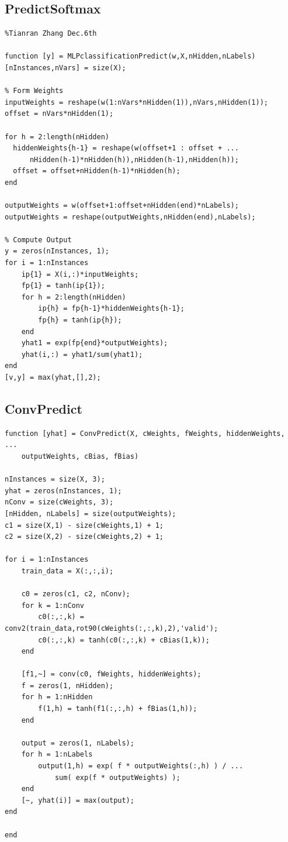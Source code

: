 \documentclass[12pt]{article}
\begin{document}
\subsection{PredictSoftmax}
\begin{lstlisting}
%Tianran Zhang Dec.6th

function [y] = MLPclassificationPredict(w,X,nHidden,nLabels)
[nInstances,nVars] = size(X);

% Form Weights
inputWeights = reshape(w(1:nVars*nHidden(1)),nVars,nHidden(1));
offset = nVars*nHidden(1);

for h = 2:length(nHidden)
  hiddenWeights{h-1} = reshape(w(offset+1 : offset + ...
      nHidden(h-1)*nHidden(h)),nHidden(h-1),nHidden(h));
  offset = offset+nHidden(h-1)*nHidden(h);
end

outputWeights = w(offset+1:offset+nHidden(end)*nLabels);
outputWeights = reshape(outputWeights,nHidden(end),nLabels);

% Compute Output
y = zeros(nInstances, 1);
for i = 1:nInstances
    ip{1} = X(i,:)*inputWeights;
    fp{1} = tanh(ip{1});
    for h = 2:length(nHidden)
        ip{h} = fp{h-1}*hiddenWeights{h-1};
        fp{h} = tanh(ip{h});
    end
    yhat1 = exp(fp{end}*outputWeights);
    yhat(i,:) = yhat1/sum(yhat1);
end
[v,y] = max(yhat,[],2);
\end{lstlisting}
\subsection{ConvPredict}
\begin{lstlisting}
function [yhat] = ConvPredict(X, cWeights, fWeights, hiddenWeights, ...
    outputWeights, cBias, fBias)

nInstances = size(X, 3);
yhat = zeros(nInstances, 1);
nConv = size(cWeights, 3);
[nHidden, nLabels] = size(outputWeights);
c1 = size(X,1) - size(cWeights,1) + 1;
c2 = size(X,2) - size(cWeights,2) + 1;

for i = 1:nInstances
    train_data = X(:,:,i);
    
    c0 = zeros(c1, c2, nConv);
    for k = 1:nConv
        c0(:,:,k) = conv2(train_data,rot90(cWeights(:,:,k),2),'valid');
        c0(:,:,k) = tanh(c0(:,:,k) + cBias(1,k));
    end
    
    [f1,~] = conv(c0, fWeights, hiddenWeights);
    f = zeros(1, nHidden);
    for h = 1:nHidden
        f(1,h) = tanh(f1(:,:,h) + fBias(1,h));
    end
    
    output = zeros(1, nLabels);
    for h = 1:nLabels
        output(1,h) = exp( f * outputWeights(:,h) ) / ...
            sum( exp(f * outputWeights) );
    end
    [~, yhat(i)] = max(output);
end

end
\end{lstlisting}
\end{document}
